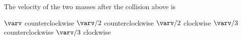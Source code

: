 \documentclass{../../oss-apphys-exam}
\newcounter{last}
\begin{document}
\begin{multicols*}{2}
\begin{questions}
    \question The velocity of the two masses after the collision above is
    \label{moon2}
    \begin{choices}
      \choice $\varv$ counterclockwise
      \choice $\varv/2$ counterclockwise
      \choice $\varv/2$ clockwise
      \choice $\varv/3$ counterclockwise
      \choice $\varv/3$ clockwise
    \end{choices}
    \vspace{.7in}
    
%    
  \end{questions}
  \setcounter{last}{\value{question}}
\end{multicols*}
\newpage
\end{document}

